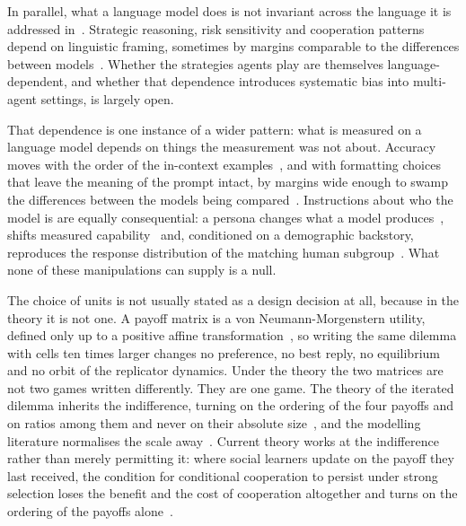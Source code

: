 \documentclass[openacc]{rsproca_new}
\begin{document}
In parallel, what a language model does is not invariant across the language
it is addressed in~\cite{buscemi2025fairgame}. Strategic reasoning, risk
sensitivity and cooperation patterns depend on linguistic framing, sometimes by
margins comparable to the differences between
models~\cite{loreheydari2024strategic,buscemi2025llms,buscemi2025strategic}.
Whether the strategies agents play are themselves language-dependent, and
whether that dependence introduces systematic bias into multi-agent settings,
is largely open.

That dependence is one instance of a wider pattern: what is measured on a
language model depends on things the measurement was not about. Accuracy moves
with the order of the in-context examples~\cite{lu2022fantastically}, and with
formatting choices that leave the meaning of the prompt intact, by margins wide
enough to swamp the differences between the models being
compared~\cite{sclar2024quantifying}. Instructions about who the model is are
equally consequential: a persona changes what a model
produces~\cite{deshpande2023toxicity}, shifts measured
capability~\cite{salewski2023context} and, conditioned on a demographic
backstory, reproduces the response distribution of the matching human
subgroup~\cite{argyle2023out}. What none of these manipulations can supply is a
null.

The choice of units is not usually stated as a design decision at all, because
in the theory it is not one. A payoff matrix is a von Neumann-Morgenstern
utility, defined only up to a positive affine
transformation~\cite{von2007theory,luce1957games}, so writing the same dilemma
with cells ten times larger changes no preference, no best reply, no
equilibrium and no orbit of the replicator dynamics. Under the theory the two
matrices are not two games written differently. They are one game. The theory
of the iterated dilemma inherits the indifference, turning on the ordering of
the four payoffs and on ratios among them and never on their absolute
size~\cite{axelrod1981evolution,nowak1992tit,nowak1993strategy,pressDyson2012},
and the modelling literature normalises the scale
away~\cite{szabo2007evolutionary,perc2010coevolutionary,wang2015universal}.
Current theory works at the indifference rather than merely permitting it:
where social learners update on the payoff they last received, the condition
for conditional cooperation to persist under strong selection loses the benefit
and the cost of cooperation altogether and turns on the ordering of the payoffs
alone~\cite{glynatsi2024evolution}.
\end{document}
